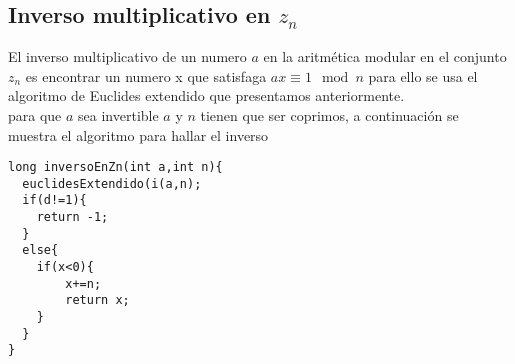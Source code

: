 \subsection{Inverso multiplicativo en $z_{n}$}
El inverso multiplicativo de un numero $a$ en la aritmética modular en el conjunto $z_{n}$ es encontrar un numero
x que satisfaga $ax \equiv 1 \mod{n}$ para ello se usa el algoritmo de Euclides extendido que presentamos anteriormente.\\
para que $a$ sea invertible $a$ y $n$ tienen que ser coprimos, a continuación se muestra el algoritmo para hallar el inverso
\begin{lstlisting}[style=C]
long inversoEnZn(int a,int n){
  euclidesExtendido(i(a,n);
  if(d!=1){
  	return -1;
  }
  else{
  	if(x<0){
  		x+=n;
   		return x;
  	}
  }
}
\end{lstlisting}
